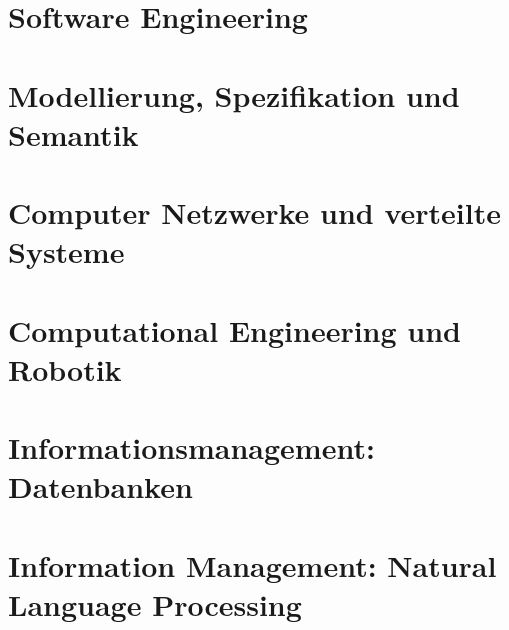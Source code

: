 \documentclass[english, notodo]{fdsummary}
\newcommand{\lstbasepath}{unset}
\begin{document}
	\cleardoublepage
	\part{Software Engineering}
	\graphicspath{{./cs/mandatory/fs3/se/}}
	\renewcommand{\lstbasepath}{./cs/mandatory/fs3/se}
	

	\cleardoublepage
	\part{Modellierung, Spezifikation und Semantik}
	\graphicspath{{./cs/mandatory/fs3/moses/}}
	\renewcommand{\lstbasepath}{./cs/mandatory/fs3/moses}
	

	\cleardoublepage
	\part{Computer Netzwerke und verteilte Systeme}
	\graphicspath{{./cs/mandatory/fs4/cnuvs/}}
	\renewcommand{\lstbasepath}{./cs/mandatory/fs4/cnuvs}
	

	\cleardoublepage
	\part{Computational Engineering und Robotik}
	\graphicspath{{./cs/mandatory/fs4/cer/}}
	\renewcommand{\lstbasepath}{./cs/mandatory/fs4/cer}
	

	\cleardoublepage
	\part{Informationsmanagement: Datenbanken}
	\graphicspath{{./cs/mandatory/fs4/infman-db/}}
	\renewcommand{\lstbasepath}{./cs/mandatory/fs4/infman-db}
	
	\cleardoublepage
	\part{Information Management: Natural Language Processing}
	\graphicspath{{./cs/mandatory/fs4/infman-nlp/}}
	\renewcommand{\lstbasepath}{./cs/mandatory/fs4/infman-nlp}
	
\end{document}
